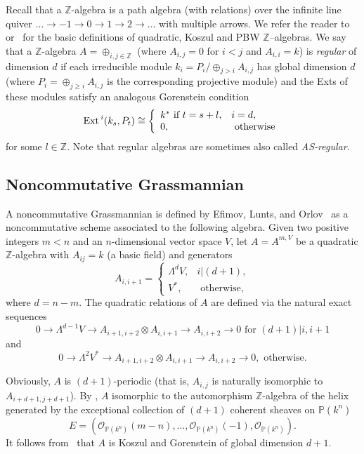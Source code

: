 \documentclass{amsart}
\numberwithin{equation}{section}
\theoremstyle{plain}
\theoremstyle{definition}
\begin{document}
Recall that a ${\ensuremath{\mathbb Z}}$-algebra is a path
algebra (with relations) over the infinite line quiver $\dots \to
-1 \to 0 \to 1
 \to 2\to \dots$ with  multiple arrows. 
 We refer the reader to~\cite{bp} or~\cite[Ch.~4, Sect.~9--10]{PP} for the basic definitions of quadratic, Koszul and PBW ${\ensuremath{\mathbb Z}}$--algebras. 
We say that
a ${\ensuremath{\mathbb Z}}$-algebra $A = \oplus_{i,j \in {\ensuremath{\mathbb Z}}}$ (where $A_{i,j} = 0$ for $i<j$ and $A_{i,i}=k$) is {\em regular} of dimension $d$ if each irreducible module 
$k_i = P_i / \oplus_{j> i}A_{i,j}$  has global dimension $d$ (where $P_i = \oplus_{j\ge i}A_{i,j}$ is the corresponding projective module)
and the Exts of these modules  satisfy an analogous Gorenstein condition~\cite[Sect.~4]{bp}
$$
{\mbox{Ext\,}}^i (k_s, P_t)\cong\left\{ \begin{array}{ll} k^* \mbox{ if } t = s+l ,& i =d, 
\\
0, & \mbox{ otherwise} 
\end{array}  \right.
$$
for some $l\in {\ensuremath{\mathbb Z}}$. Note that regular algebras are sometimes also called {\em AS-regular}. 

\subsection{Noncommutative Grassmannian}

\label{subs:gras}

A noncommutative Grassmannian is defined by Efimov, Lunts, and
Orlov~\cite[Part~3]{elo} as a noncommutative scheme associated to
the  following algebra. 
  Given two positive integers $m<n$ and an $n$-dimensional
vector space $V$, let $A = A^{m,V}$ be a quadratic ${\ensuremath{\mathbb Z}}$-algebra
with $A_{ij} = k$ (a basic field) and generators
$$
A_{i,i+1} = \left\{\begin{array}{ll} {{\Lambda}}^d V, & i|(d+1),\\
 V^*, &\mbox{ otherwise, }
\end{array} \right.
$$
where $d=n-m$. The quadratic relations of $A$ are defined via the
natural exact sequences
$$
0\to \Lambda^{d-1} V \to A_{i+1,i+2}\otimes A_{i,i+1} \to
A_{i,i+2} \to 0 \mbox{ for } (d+1)|i,i+1
$$
and
$$
0\to \Lambda^2 V^* \to A_{i+1,i+2}\otimes A_{i,i+1} \to A_{i,i+2}
\to 0, \mbox{ otherwise}.
$$

Obviously, $A$ is $(d+1)$-periodic (that is, $A_{i,j}$ is
naturally isomorphic to $A_{i+d+1,j+d+1}$).
By \cite[Prop.~8.18]{elo}, $A$ isomorphic to the automorphism ${\ensuremath{\mathbb Z}}$-algebra of the helix
generated by the exceptional collection of $(d+1)$ coherent sheaves on ${\ensuremath{\mathbb P}} (k^n)$
$$
E = ({\mathcal O}_{{\ensuremath{\mathbb P}} (k^n)}(m-n), \dots, {\mathcal O}_{{\ensuremath{\mathbb P}} (k^n)}(-1), {\mathcal O}_{{\ensuremath{\mathbb P}} (k^n)} ). 
$$
 It follows from~\cite{bp} that 
$A$ is Koszul and
Gorenstein of global dimension $d+1$. 
\end{document}

